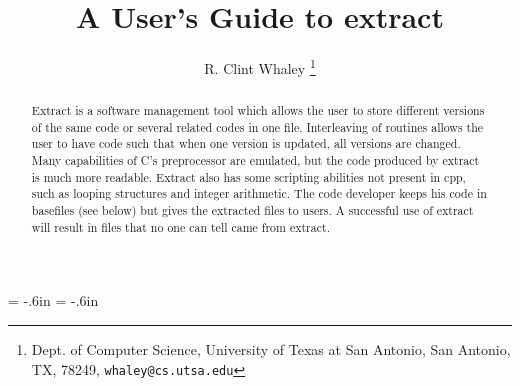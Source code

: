 
\textwidth=6in
\textheight=8.5in
\hoffset = -.6in
\voffset = -.6in

\newcommand{\ttbs}{\char'134}
\newcommand{\AmS}{{\protect\the\textfont2
  A\kern-.1667em\lower.5ex\hbox{M}\kern-.125emS}}

\title{A User's Guide to extract}

\vspace{2.5in}

\author{
R. Clint Whaley
\thanks{
Dept. of Computer Science, University of Texas at San Antonio,
San Antonio, TX, 78249, {\tt whaley@cs.utsa.edu}
}
}
       

\maketitle

\begin{abstract}
Extract is a software management tool which allows the user to store
different versions of the same code or several related codes in one file.
Interleaving of routines allows the user to have code such that when one
version is updated, all versions are changed.  Many capabilities of 
C's preprocessor are emulated, but the code produced by extract is
much more readable.  Extract also has some scripting abilities
not present in cpp, such as looping structures and integer arithmetic.
The code developer keeps his code in basefiles (see below) but gives
the extracted files to users.  A successful use of extract will
result in files that no one can tell came from extract.
\end{abstract}

\newpage
\tableofcontents
\newpage

